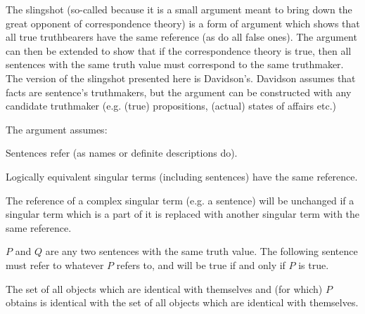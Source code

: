 The slingshot (so-called because it is a small argument meant to bring down the great opponent of correspondence theory) is a form of argument which shows that all true truthbearers have the same reference (as do all false ones).
The argument can then be extended to show that if the correspondence theory is true, then all sentences with the same truth value must correspond to the same truthmaker.
The version of the slingshot presented here is Davidson's.
\parencite[753]{Davidson_1969}
Davidson assumes that facts are sentence's truthmakers, but the argument can be constructed with any candidate truthmaker (e.g. (true) propositions, (actual) states of affairs etc.)
\parencite[752]{Davidson_1969}

The argument assumes:

	\begin{thesis} \label{srefer}
	Sentences refer (as names or definite descriptions do).
	\end{thesis}


	\begin{thesis} \label{sameref}
	Logically equivalent singular terms (including sentences) have the same reference.
	\end{thesis}


	\begin{thesis} \label{constref}
	The reference of a complex singular term (e.g. a sentence) will be unchanged if a singular term which is a part of it is replaced with another singular term with the same reference.
	\end{thesis}

$P$ and $Q$ are any two sentences with the same truth value.
The following sentence must refer to whatever $P$ refers to, and will be true if and only if $P$ is true.

	\begin{example} \label{setP}
	The set of all objects which are identical with themselves and (for which) $P$ obtains is identical with the set of all objects which are identical with themselves.
	\end{example}


